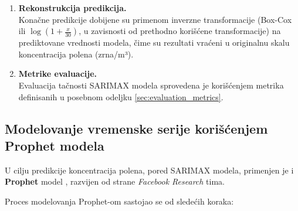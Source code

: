 \documentclass[12pt]{article}
\begin{document}
\begin{enumerate}
    \item \textbf{Rekonstrukcija predikcija.} \\
    Konačne predikcije dobijene su primenom inverzne transformacije (Box-Cox ili $\log(1 + \frac{x}{30})$, u zavisnosti od prethodno korišćene transformacije) na prediktovane vrednosti modela, čime su rezultati vraćeni u originalnu skalu koncentracija polena (zrna/m³).

    \item \textbf{Metrike evaluacije.} \\
    Evaluacija tačnosti SARIMAX modela sprovedena je korišćenjem metrika definisanih u posebnom odeljku \ref{sec:evaluation_metrics}.

\end{enumerate}

\subsection{Modelovanje vremenske serije korišćenjem Prophet modela}

U cilju predikcije koncentracija polena, pored SARIMAX modela, primenjen je i \textbf{Prophet} model \cite{taylor2018}, razvijen od strane \textit{Facebook Research} tima.

Proces modelovanja Prophet-om sastojao se od sledećih koraka:
\end{document}

